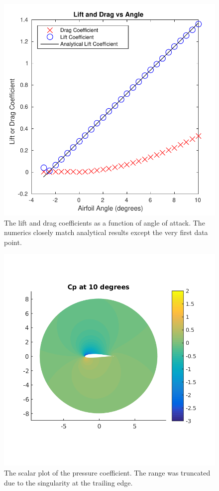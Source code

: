 \documentclass{article}
\begin{document}
\begin{figure}
\centering
\includegraphics[scale=1.0]{LiftAndDrag.pdf}
\caption{The lift and drag coefficients as a function of angle of attack. The numerics closely match analytical results except the very first data point.}
\label{fig:liftanddrag}
\end{figure}

\begin{figure}
\centering
\includegraphics[scale=1.0]{Cp.png}
\caption{The scalar plot of the pressure coefficient. The range was truncated due to the singularity at the trailing edge.} 
\label{fig:Cp}
\end{figure}
\end{document}
